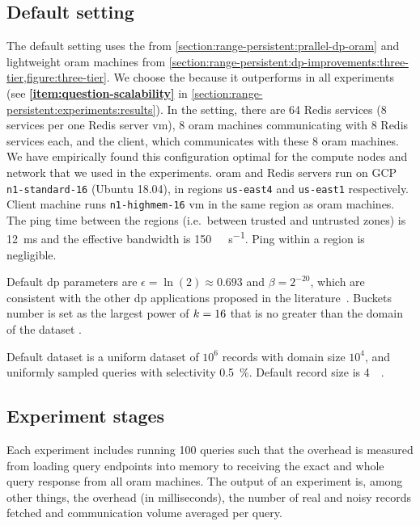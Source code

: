 	\subsection{Default setting}\label{section:range-persistent:experiments:default-setting}

		The default setting uses the \protocolGamma{} from \cref{section:range-persistent:prallel-dp-oram} and lightweight \acrshort{oram} machines from \cref{section:range-persistent:dp-improvements:three-tier,figure:three-tier}.
		We choose the \protocolGamma{} because it outperforms \protocolNoGamma{} in all experiments (see \textbf{\ref{item:question-scalability}} in \cref{section:range-persistent:experiments:results}).
		In the setting, there are 64 Redis services (8 services per one Redis server \acrshort{vm}), 8 \acrshort{oram} machines communicating with 8 Redis services each, and the client, which communicates with these 8 \acrshort{oram} machines.
		We have empirically found this configuration optimal for the compute nodes and network that we used in the experiments.
		\acrshort{oram} and Redis servers run on GCP \texttt{n1-standard-16}  (Ubuntu 18.04), in regions \texttt{us-east4} and \texttt{us-east1} respectively.
		Client machine runs \texttt{n1-highmem-16} \acrshort{vm} in the same region as \acrshort{oram} machines.
		The ping time between the regions (i.e.\ between trusted and untrusted zones) is \SI{12}{\milli\second} and the effective bandwidth is \SI{150}{\mega\byte\per\second}.
		Ping within a region is negligible.

		Default \acrshort{dp} parameters are $\epsilon = \ln(2) \approx \num{0.693}$ and $\beta = 2^{-20}$, which are consistent with the other \acrshort{dp} applications proposed in the literature~\cite{choosing-epsilon}.
		Buckets number is set as the largest power of $k = 16$ that is no greater than the domain of the dataset \domainSize{}.

		Default dataset is a uniform dataset of $10^6$ records with domain size $10^4$, and uniformly sampled queries with selectivity \SI{0.5}{\percent}.
		Default record size is \SI{4}{\kibi\byte}.

	\subsection{Experiment stages}

		Each experiment includes running 100 queries such that the overhead is measured from loading query endpoints into memory to receiving the exact and whole query response from all \acrshort{oram} machines.
		The output of an experiment is, among other things, the overhead (in milliseconds), the number of real and noisy records fetched and communication volume averaged per query.

